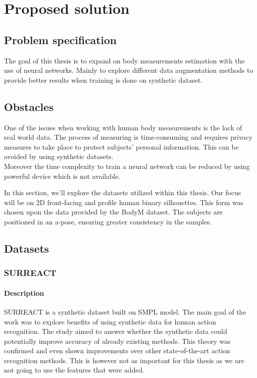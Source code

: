 \chapter{Proposed solution}

\section{Problem specification}
The goal of this thesis is to expand on body measurements estimation with the use of neural networks. Mainly to explore different data augmentation methods to provide better results when training is done on synthetic dataset.

\section{Obstacles}
One of the issues when working with human body measurements is the lack of real world data. The process of measuring is time-consuming and requires privacy measures to take place to protect subjects' personal information. This can be avoided by using synthetic datasets.\\
Moreover the time complexity to train a neural network can be reduced by using powerful device which is not available.
\newpage

In this section, we'll explore the datasets utilized within this thesis. Our focus will be on 2D front-facing and profile human binary silhouettes. This form was chosen upon the data provided by the BodyM dataset. The subjects are positioned in an a-pose, ensuring greater consistency in the samples.
\section{Datasets}
\subsection{SURREACT}
\subsubsection{Description}
SURREACT \cite{surreact} is a synthetic dataset built on SMPL model. The main goal of the work was to explore benefits of using synthetic data for  human action recognition.  The study aimed to answer whether the synthetic data could potentially improve accuracy of already existing methods. This theory was confirmed and even shown improvements over other state-of-the-art action recognition methods. This is however not as important for this thesis as we are not going to use the features that were added.

